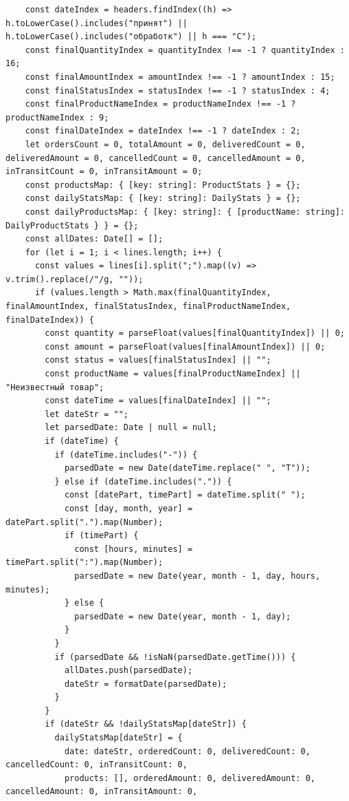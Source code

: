 \begin{code}
\begin{verbatim}
    const dateIndex = headers.findIndex((h) => h.toLowerCase().includes("принят") || h.toLowerCase().includes("обработк") || h === "C");
    const finalQuantityIndex = quantityIndex !== -1 ? quantityIndex : 16;
    const finalAmountIndex = amountIndex !== -1 ? amountIndex : 15;
    const finalStatusIndex = statusIndex !== -1 ? statusIndex : 4;
    const finalProductNameIndex = productNameIndex !== -1 ? productNameIndex : 9;
    const finalDateIndex = dateIndex !== -1 ? dateIndex : 2;
    let ordersCount = 0, totalAmount = 0, deliveredCount = 0, deliveredAmount = 0, cancelledCount = 0, cancelledAmount = 0, inTransitCount = 0, inTransitAmount = 0;
    const productsMap: { [key: string]: ProductStats } = {};
    const dailyStatsMap: { [key: string]: DailyStats } = {};
    const dailyProductsMap: { [key: string]: { [productName: string]: DailyProductStats } } = {};
    const allDates: Date[] = [];
    for (let i = 1; i < lines.length; i++) {
      const values = lines[i].split(";").map((v) => v.trim().replace(/"/g, ""));
      if (values.length > Math.max(finalQuantityIndex, finalAmountIndex, finalStatusIndex, finalProductNameIndex, finalDateIndex)) {
        const quantity = parseFloat(values[finalQuantityIndex]) || 0;
        const amount = parseFloat(values[finalAmountIndex]) || 0;
        const status = values[finalStatusIndex] || "";
        const productName = values[finalProductNameIndex] || "Неизвестный товар";
        const dateTime = values[finalDateIndex] || "";
        let dateStr = "";
        let parsedDate: Date | null = null;
        if (dateTime) {
          if (dateTime.includes("-")) {
            parsedDate = new Date(dateTime.replace(" ", "T"));
          } else if (dateTime.includes(".")) {
            const [datePart, timePart] = dateTime.split(" ");
            const [day, month, year] = datePart.split(".").map(Number);
            if (timePart) {
              const [hours, minutes] = timePart.split(":").map(Number);
              parsedDate = new Date(year, month - 1, day, hours, minutes);
            } else {
              parsedDate = new Date(year, month - 1, day);
            }
          }
          if (parsedDate && !isNaN(parsedDate.getTime())) {
            allDates.push(parsedDate);
            dateStr = formatDate(parsedDate);
          }
        }
        if (dateStr && !dailyStatsMap[dateStr]) {
          dailyStatsMap[dateStr] = {
            date: dateStr, orderedCount: 0, deliveredCount: 0, cancelledCount: 0, inTransitCount: 0,
            products: [], orderedAmount: 0, deliveredAmount: 0, cancelledAmount: 0, inTransitAmount: 0,

\end{verbatim}
\end{code}
